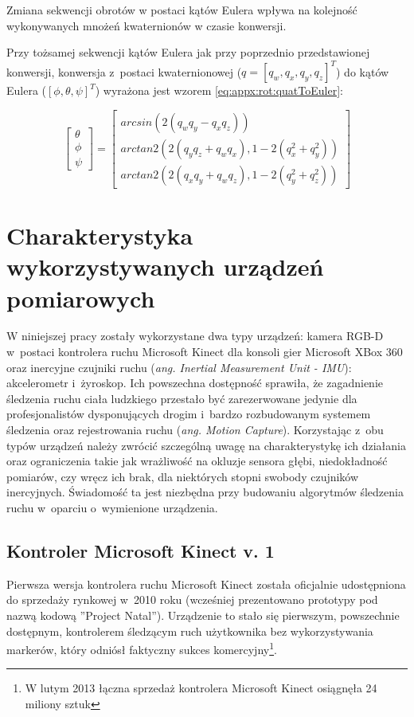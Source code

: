 Zmiana sekwencji obrotów w postaci kątów Eulera	wpływa na kolejność wykonywanych mnożeń kwaternionów w czasie konwersji.

Przy tożsamej sekwencji kątów Eulera jak przy poprzednio przedstawionej konwersji, konwersja z~postaci kwaternionowej ($q = [q_w, q_x, q_y, q_z]^T$) do kątów Eulera ($[\phi, \theta, \psi]^T$) wyrażona jest wzorem \ref{eq:appx:rot:quatToEuler}:
		
		\begin{equation}
		\label{eq:appx:rot:quatToEuler}
		\begin{bmatrix}\theta \\ \phi \\ \psi \end{bmatrix} =	
		\begin{bmatrix}                                                   
	arcsin(2(q_w q_y - q_x q_z))                             \\
	arctan2(2(q_y q_z + q_w q_x), 1-2(q_x^2 + q_y^2)) \\
	arctan2(2(q_x q_y + q_w q_z), 1-2(q_y^2 + q_z^2)) 
	\end{bmatrix} 		
		\end{equation}
		
																													
\section{Charakterystyka wykorzystywanych urządzeń pomiarowych}\label{chap:characteristics}
W niniejszej pracy zostały wykorzystane dwa typy urządzeń: kamera RGB-D w~postaci kontrolera ruchu Microsoft Kinect dla konsoli gier Microsoft XBox 360 oraz inercyjne czujniki ruchu (\emph{ang. Inertial Measurement Unit - IMU}): akcelerometr i~żyroskop. Ich powszechna dostępność sprawiła, że zagadnienie śledzenia ruchu ciała ludzkiego przestało być zarezerwowane jedynie dla profesjonalistów dysponujących drogim i~bardzo rozbudowanym systemem śledzenia oraz rejestrowania ruchu (\emph{ang. Motion Capture}). Korzystając z~obu typów urządzeń należy zwrócić szczególną uwagę na charakterystykę ich działania oraz ograniczenia takie jak wrażliwość na okluzje sensora głębi, niedokładność pomiarów, czy wręcz ich brak, dla niektórych stopni swobody czujników inercyjnych. Świadomość ta jest niezbędna przy budowaniu algorytmów śledzenia ruchu w~oparciu o~wymienione urządzenia. 
																													
\subsection{Kontroler Microsoft Kinect v. 1}\label{sec:characteristics:kinect}
Pierwsza wersja kontrolera ruchu Microsoft Kinect została oficjalnie udostępniona do sprzedaży rynkowej w~2010 roku (wcześniej prezentowano prototypy pod nazwą kodową ''Project Natal''). Urządzenie to stało się pierwszym, powszechnie dostępnym, kontrolerem śledzącym ruch użytkownika bez wykorzystywania markerów, który odniósł faktyczny sukces komercyjny\footnote{W lutym 2013 łączna sprzedaż kontrolera Microsoft Kinect osiągnęła 24 miliony sztuk }.  
																													
